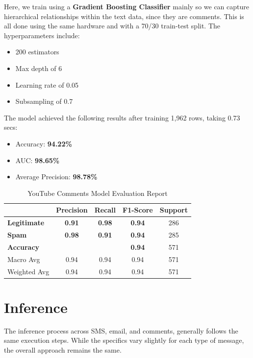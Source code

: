 \documentclass{article}
\begin{document}
Here, we train using a \textbf{Gradient Boosting Classifier} mainly so we can capture hierarchical relationships within the text data, since they are comments. This is all done using the same hardware and with a 70/30 train-test split. The hyperparameters include:

\begin{itemize}
    \item 200 estimators
    \item Max depth of 6
    \item Learning rate of 0.05
    \item Subsampling of 0.7
\end{itemize}

\noindent
The model achieved the following results after training 1,962 rows, taking 0.73 secs:

\begin{itemize}
    \item Accuracy: \textbf{94.22\%}
    \item AUC: \textbf{98.65\%}
    \item Average Precision: \textbf{98.78\%}
\end{itemize}

\begin{table}[htbp]
    \centering
    \caption{YouTube Comments Model Evaluation Report}
    \begin{tabular}{l c c c c}
    \toprule
     & \textbf{Precision} & \textbf{Recall} & \textbf{F1-Score} & Support \\
    \midrule
    \textbf{Legitimate} & \textbf{0.91} & \textbf{0.98} & \textbf{0.94} & 286 \\
    \textbf{Spam} & \textbf{0.98} & \textbf{0.91} & \textbf{0.94} & 285 \\
    \midrule
    \textbf{Accuracy}  & & & \textbf{0.94} & 571 \\
    Macro Avg & 0.94 & 0.94 & 0.94 & 571 \\
    Weighted Avg & 0.94 & 0.94 & 0.94 & 571 \\
    \bottomrule
    \end{tabular}
    \label{tab:gbm_evaluation}
\end{table}

\newpage

\section{Inference}

The inference process across SMS, email, and comments, generally follows the same execution steps. While the specifics vary slightly for each type of message, the overall approach remains the same.
\end{document}
